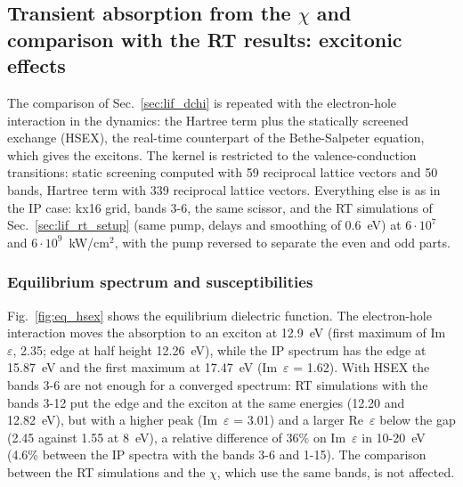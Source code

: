 \documentclass[10pt,a4paper]{paper}
\begin{document}
\FloatBarrier
\subsection{Transient absorption from the $\chi$ and comparison with the RT results: excitonic effects}
\label{sec:lif_hsex}

The comparison of Sec.~\ref{sec:lif_dchi} is repeated with the electron-hole interaction in the dynamics: the Hartree
term plus the statically screened exchange (HSEX), the real-time counterpart of the Bethe-Salpeter equation, which
gives the excitons. The kernel is restricted to the valence-conduction transitions: static screening computed with 59 reciprocal lattice vectors and 50 bands, Hartree term with 339
reciprocal lattice vectors. Everything else is as in the IP case: kx16 grid, bands 3-6, the same scissor, and the RT
simulations of Sec.~\ref{sec:lif_rt_setup} (same pump, delays and smoothing of 0.6~eV) at $6\cdot10^7$ and
$6\cdot10^9$~kW/cm$^2$, with the pump reversed to separate the even and odd parts.

\subsubsection{Equilibrium spectrum and susceptibilities}
\label{sec:lif_hsex_chi}

Fig.~\ref{fig:eq_hsex} shows the equilibrium dielectric function. The electron-hole interaction moves the absorption
to an exciton at 12.9~eV (first maximum of Im~$\varepsilon$, 2.35; edge at half height 12.26~eV), while the IP
spectrum has the edge at 15.87~eV and the first maximum at 17.47~eV (Im~$\varepsilon$ = 1.62). With HSEX the bands 3-6 are
not enough for a converged spectrum: RT simulations with the bands 3-12 put the edge and the exciton at
the same energies (12.20 and 12.82~eV), but with a higher peak (Im~$\varepsilon$ = 3.01) and a larger Re~$\varepsilon$ below
the gap (2.45 against 1.55 at 8~eV), a relative difference of 36\% on Im~$\varepsilon$ in 10-20~eV (4.6\% between the
IP spectra with the bands 3-6 and 1-15). The comparison between the RT simulations and the $\chi$, which use the same
bands, is not affected.
\end{document}
